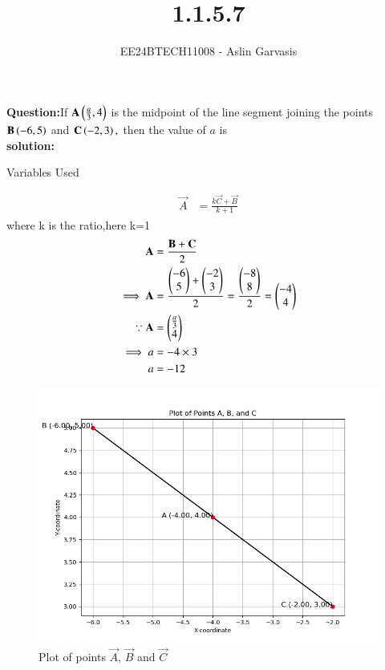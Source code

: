 \documentclass[journal]{IEEEtran}
\begin{document}

\vspace{3cm}
\title{1.1.5.7}
\author{EE24BTECH11008 - Aslin Garvasis
}
{\let\newpage\relax\maketitle}

\renewcommand{\thefigure}{\theenumi}
\renewcommand{\thetable}{\theenumi}
\setlength{\intextsep}{10pt} %


\renewcommand{\thetable}{\theenumi}
 \textbf{Question:}If $\mathbf{A}\left(\frac{a}{3},4\right)$ is the midpoint of the line segment joining the points $\mathbf{B}\left(-6,5\right)$ and $\mathbf{C}\left(-2,3\right),$  
		then the value of $a$ is\\
 
\textbf{solution:}\\
\begin{table}[h!]    
  \centering
  
  \caption{Variables Used}
  \label{tab1.1.5.7}
\end{table}
\begin{align}
\vec{A} &=\frac{k\vec{C}+\vec{B}}{k+1}
\end{align}	
			where k is the ratio,here k=1\\
\begin{align}
 \mathbf{A}&=\frac{\mathbf{B}+\mathbf{C}}{2}\\ 
\implies \mathbf{A}&=\frac{\begin{pmatrix}-6\\5\end{pmatrix}+\begin{pmatrix}-2\\3\end{pmatrix}}{2}=\frac{\begin{pmatrix}-8\\8\end{pmatrix}}{2}=\begin{pmatrix}-4\\4\end{pmatrix}\\
\because \mathbf{A}&=\begin{pmatrix}\frac{a}{3}\\4\end{pmatrix}\\
\implies a&=-4\times3\\ 
 a&=-12
\end{align}
		\newpage


		\begin{figure}[h!]
                \centering
               \includegraphics[width=0.7\linewidth]{figs/Fig1.png}
			\caption{Plot of points $\vec{A}$, $\vec{B}$ and $\vec{C}$}
               
               \end{figure}
\end{document}
